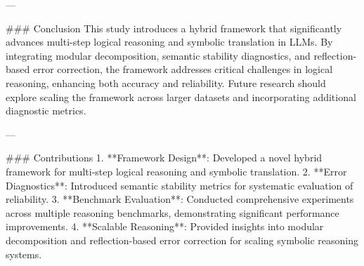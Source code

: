 ---

### Conclusion  
This study introduces a hybrid framework that significantly advances multi-step logical reasoning and symbolic translation in LLMs. By integrating modular decomposition, semantic stability diagnostics, and reflection-based error correction, the framework addresses critical challenges in logical reasoning, enhancing both accuracy and reliability. Future research should explore scaling the framework across larger datasets and incorporating additional diagnostic metrics.

---

### Contributions  
1. **Framework Design**: Developed a novel hybrid framework for multi-step logical reasoning and symbolic translation.  
2. **Error Diagnostics**: Introduced semantic stability metrics for systematic evaluation of reliability.  
3. **Benchmark Evaluation**: Conducted comprehensive experiments across multiple reasoning benchmarks, demonstrating significant performance improvements.  
4. **Scalable Reasoning**: Provided insights into modular decomposition and reflection-based error correction for scaling symbolic reasoning systems.  

